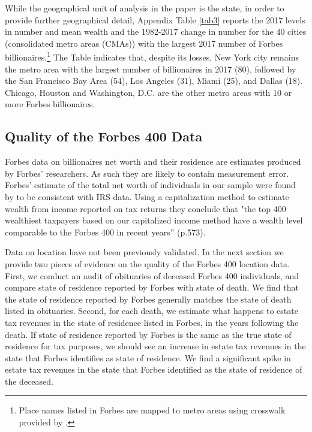 \documentclass[12pt]{article}
\begin{document}
While the geographical unit of analysis in the paper is the state, in order to provide further geographical detail, Appendix Table \ref{tab3}
reports the 2017 levels in number and mean wealth and the 1982-2017 change in number for the 40 cities (consolidated metro areas (CMAs)) with the largest 2017 number of Forbes billionaires.\footnote{Place names listed in Forbes are mapped to metro areas using crosswalk provided by \cite{maggot}.} The Table indicates that, despite its losses, New York city remains the metro area with the largest number of billionaires in 2017 (80), followed by the San Francisco Bay Area (54), Los Angeles (31), Miami (25), and Dallas (18). Chicago, Houston and Washington, D.C. are the other metro areas with 10 or more Forbes billionaires. 



\subsection{Quality of the Forbes 400 Data}

Forbes data on billionaires net worth and their residence are estimates produced by Forbes' researchers. As such they are likely to contain measurement error. 
Forbes' estimate of the total net worth of individuals in our sample were found by \cite{saez2016wealth} to be consistent with IRS data. Using a capitalization method to estimate wealth from income reported on tax returns they conclude that "the top 400 wealthiest taxpayers based on our capitalized income method have a wealth level comparable to the Forbes 400 in recent years'' (p.573).

Data on location have not been previously validated.
In the next section we provide two pieces of evidence on the quality of the Forbes 400 location data. First, we conduct an audit of obituaries of deceased Forbes 400 individuals, and compare state of residence reported by Forbes with state of death.  We find that the state of residence reported by Forbes generally matches the state of death listed in obituaries.
Second, for each death, we  estimate what happens to estate tax revenues in the state of residence listed in Forbes, in the years following the death. If state of residence reported by Forbes is the same as the true state of residence for tax purposes, we should see an increase in estate tax revenues in the state that Forbes identifies as state of residence.  We find  a significant spike in estate tax revenues in the state that Forbes identified as the state of residence of the deceased. 
\end{document}
